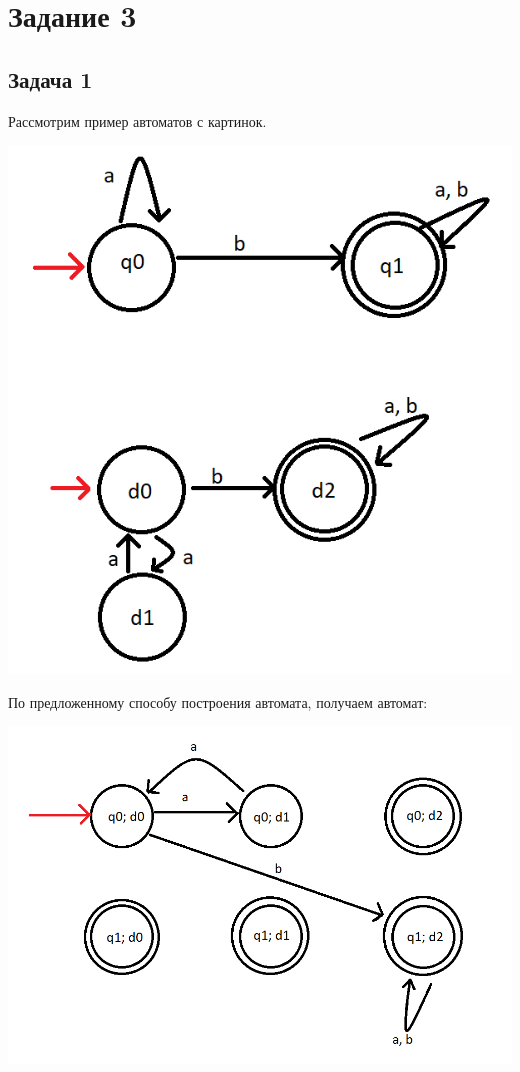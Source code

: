 \documentclass[a4paper,14pt]{article} %
\begin{document}

\section{Задание 3}
\subsection{Задача 1}
    Рассмотрим пример автоматов с картинок.
   
    \includegraphics[scale = 0.7]{01.png}
   
    По предложенному способу построения автомата, получаем автомат:

    \includegraphics[scale = 0.7]{02.png}
\end{document}
